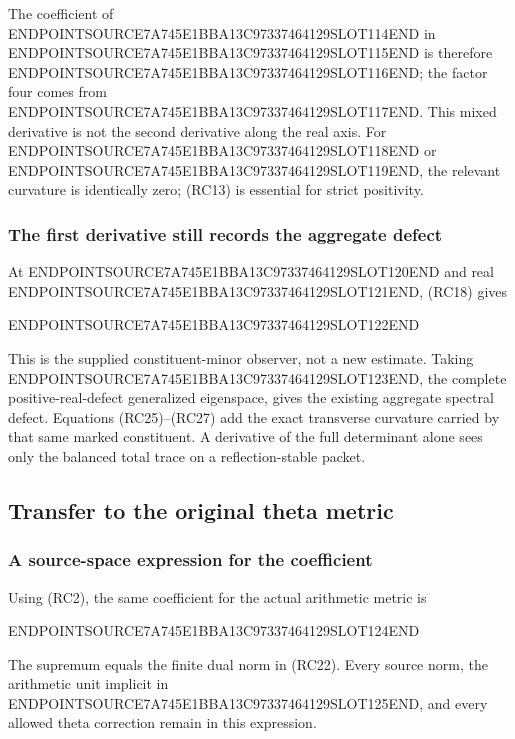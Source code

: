 The coefficient of ENDPOINTSOURCE7A745E1BBA13C97337464129SLOT114END in ENDPOINTSOURCE7A745E1BBA13C97337464129SLOT115END is therefore ENDPOINTSOURCE7A745E1BBA13C97337464129SLOT116END; the factor four comes from ENDPOINTSOURCE7A745E1BBA13C97337464129SLOT117END. This mixed derivative is not the second derivative along the real axis. For ENDPOINTSOURCE7A745E1BBA13C97337464129SLOT118END or ENDPOINTSOURCE7A745E1BBA13C97337464129SLOT119END, the relevant curvature is identically zero; (RC13) is essential for strict positivity.

\subsubsection{The first derivative still records the aggregate defect}\label{endpoint-residue_original--the-first-derivative-still-records-the-aggregate-defect}

At ENDPOINTSOURCE7A745E1BBA13C97337464129SLOT120END and real ENDPOINTSOURCE7A745E1BBA13C97337464129SLOT121END, (RC18) gives

ENDPOINTSOURCE7A745E1BBA13C97337464129SLOT122END

This is the supplied constituent-minor observer, not a new estimate. Taking ENDPOINTSOURCE7A745E1BBA13C97337464129SLOT123END, the complete positive-real-defect generalized eigenspace, gives the existing aggregate spectral defect. Equations (RC25)--(RC27) add the exact transverse curvature carried by that same marked constituent. A derivative of the full determinant alone sees only the balanced total trace on a reflection-stable packet.

\subsection{Transfer to the original theta metric}\label{endpoint-residue_original--transfer-to-the-original-theta-metric}

\subsubsection{A source-space expression for the coefficient}\label{endpoint-residue_original--a-source-space-expression-for-the-coefficient}

Using (RC2), the same coefficient for the actual arithmetic metric is

ENDPOINTSOURCE7A745E1BBA13C97337464129SLOT124END

The supremum equals the finite dual norm in (RC22). Every source norm, the arithmetic unit implicit in ENDPOINTSOURCE7A745E1BBA13C97337464129SLOT125END, and every allowed theta correction remain in this expression.


